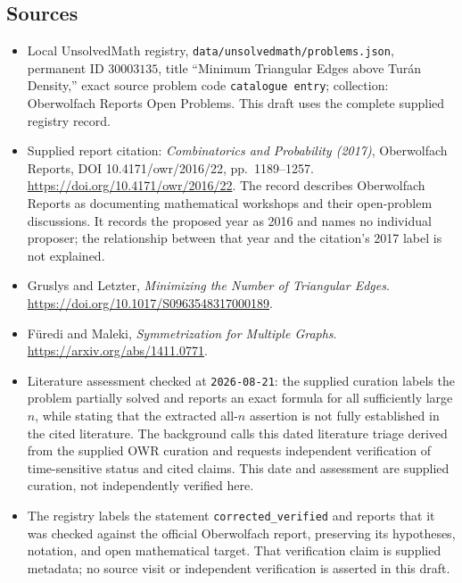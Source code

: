 \documentclass[11pt]{article}
\begin{document}
\subsection{Sources}
\begin{itemize}
\item Local UnsolvedMath registry, \texttt{data/unsolvedmath/problems.json}, permanent ID \(30003135\), title ``Minimum Triangular Edges above Tur\'an Density,'' exact source problem code \texttt{catalogue entry}; collection: Oberwolfach Reports Open Problems. This draft uses the complete supplied registry record.
\item Supplied report citation: \emph{Combinatorics and Probability (2017)}, Oberwolfach Reports, DOI 10.4171/owr/2016/22, pp.~1189--1257. \url{https://doi.org/10.4171/owr/2016/22}. The record describes Oberwolfach Reports as documenting mathematical workshops and their open-problem discussions. It records the proposed year as 2016 and names no individual proposer; the relationship between that year and the citation's 2017 label is not explained.
\item Gruslys and Letzter, \emph{Minimizing the Number of Triangular Edges}. \url{https://doi.org/10.1017/S0963548317000189}.
\item F\"uredi and Maleki, \emph{Symmetrization for Multiple Graphs}. \url{https://arxiv.org/abs/1411.0771}.
\item Literature assessment checked at \texttt{2026-08-21}: the supplied curation labels the problem partially solved and reports an exact formula for all sufficiently large \(n\), while stating that the extracted all-\(n\) assertion is not fully established in the cited literature. The background calls this dated literature triage derived from the supplied OWR curation and requests independent verification of time-sensitive status and cited claims. This date and assessment are supplied curation, not independently verified here.
\item The registry labels the statement \texttt{corrected\_verified} and reports that it was checked against the official Oberwolfach report, preserving its hypotheses, notation, and open mathematical target. That verification claim is supplied metadata; no source visit or independent verification is asserted in this draft.
\end{itemize}
\end{document}
